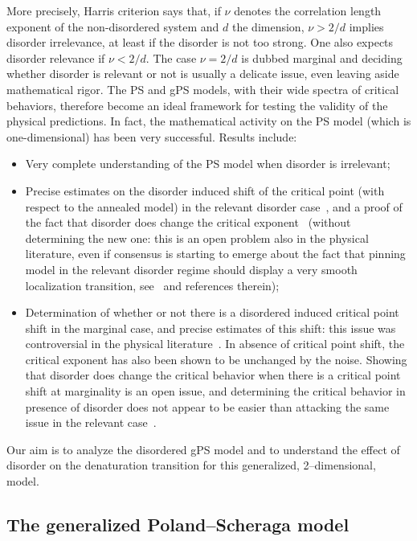 \documentclass[AHL,Unicode,longabstracts]{cedram}
\begin{document}
More precisely, Harris criterion says that, if $\nu$ denotes the correlation length exponent of the non-disordered system and $d $ the dimension, $\nu >2/d$ implies disorder irrelevance, at least if the disorder is not too strong. One also expects disorder relevance if $\nu< 2/d$. The case $\nu= 2/d$ is dubbed marginal and deciding whether disorder is relevant or not is usually a delicate issue, even leaving aside mathematical rigor. The PS and gPS models, with their wide spectra of critical behaviors, therefore become an ideal framework for testing the validity of the physical predictions. In fact, the mathematical activity on the PS model (which is one-dimensional) has been very successful. Results include:
\begin{itemize}
\item Very complete understanding of the PS model when disorder is irrelevant\linebreak\cite{cf:A08,cf:G,cf:Lac,cf:Ton08};
\item Precise estimates on the disorder induced shift of the critical point (with respect to the annealed model) in the relevant disorder case~\cite{cf:AZ09,cf:DGLT09}, and a proof of the fact that disorder does change the critical exponent~\cite{cf:CH13,cf:GT06} (without determining the new one: this is an open problem also in the physical literature, even if consensus is starting to emerge about the fact that pinning model in the relevant disorder regime should display a very smooth localization transition, see~\cite{cf:BGL,cf:DR} and references therein);
\item Determination of whether or not there is a disordered induced critical point shift in the marginal case, and precise estimates of this shift: this issue was controversial in the physical literature~\cite{cf:BL16,cf:1GLT10}. In absence of critical point shift, the critical exponent has also been shown to be unchanged by the noise. Showing that disorder does change the critical behavior when there is a critical point shift at marginality is an open issue, and determining the critical behavior in presence of disorder does not appear to be easier than attacking the same issue in the relevant case~\cite{cf:DR}.
\end{itemize}

Our aim is to analyze the disordered gPS model and to understand the effect of disorder on the denaturation transition for this generalized, 2--dimensional, model.

\subsection{The generalized Poland--Scheraga model}\label{sec:model}
\end{document}
